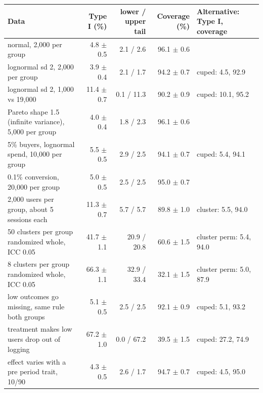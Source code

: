 \begin{tabular}{p{4.3cm}rrrp{4.4cm}}
\toprule
Data & Type I (\%) & lower / upper tail & Coverage (\%) & Alternative: Type I, coverage \\
\midrule
normal, 2,000 per group & 4.8 $\pm$ 0.5 & 2.1 / 2.6 & 96.1 $\pm$ 0.6 &  \\
lognormal sd 2, 2,000 per group & 3.9 $\pm$ 0.4 & 2.1 / 1.7 & 94.2 $\pm$ 0.7 & cuped: 4.5, 92.9 \\
lognormal sd 2, 1,000 vs 19,000 & 11.4 $\pm$ 0.7 & 0.1 / 11.3 & 90.2 $\pm$ 0.9 & cuped: 10.1, 95.2 \\
Pareto shape 1.5 (infinite variance), 5,000 per group & 4.0 $\pm$ 0.4 & 1.8 / 2.3 & 96.1 $\pm$ 0.6 &  \\
5\% buyers, lognormal spend, 10,000 per group & 5.5 $\pm$ 0.5 & 2.9 / 2.5 & 94.1 $\pm$ 0.7 & cuped: 5.4, 94.1 \\
0.1\% conversion, 20,000 per group & 5.0 $\pm$ 0.5 & 2.5 / 2.5 & 95.0 $\pm$ 0.7 &  \\
2,000 users per group, about 5 sessions each & 11.3 $\pm$ 0.7 & 5.7 / 5.7 & 89.8 $\pm$ 1.0 & cluster: 5.5, 94.0 \\
50 clusters per group randomized whole, ICC 0.05 & 41.7 $\pm$ 1.1 & 20.9 / 20.8 & 60.6 $\pm$ 1.5 & cluster perm: 5.4, 94.0 \\
8 clusters per group randomized whole, ICC 0.05 & 66.3 $\pm$ 1.1 & 32.9 / 33.4 & 32.1 $\pm$ 1.5 & cluster perm: 5.0, 87.9 \\
low outcomes go missing, same rule both groups & 5.1 $\pm$ 0.5 & 2.5 / 2.5 & 92.1 $\pm$ 0.9 & cuped: 5.1, 93.2 \\
treatment makes low users drop out of logging & 67.2 $\pm$ 1.0 & 0.0 / 67.2 & 39.5 $\pm$ 1.5 & cuped: 27.2, 74.9 \\
effect varies with a pre period trait, 10/90 & 4.3 $\pm$ 0.5 & 2.6 / 1.7 & 94.7 $\pm$ 0.7 & cuped: 4.5, 95.0 \\
\bottomrule
\end{tabular}
